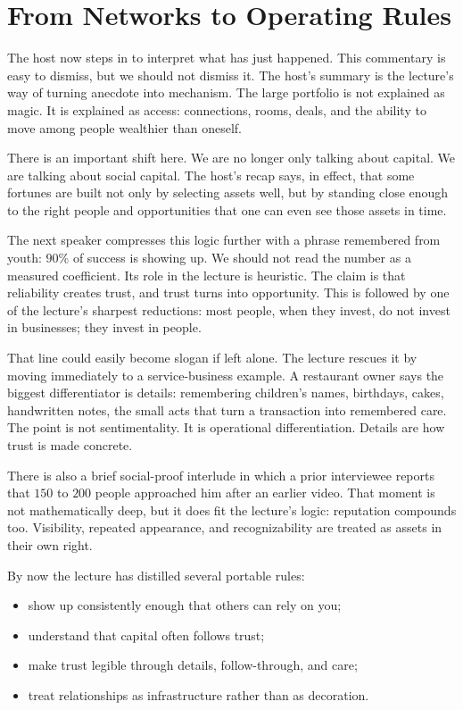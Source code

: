 \section{From Networks to Operating Rules}

The host now steps in to interpret what has just happened. This commentary is easy to dismiss, but we should not dismiss it. The host's summary is the lecture's way of turning anecdote into mechanism. The large portfolio is not explained as magic. It is explained as access: connections, rooms, deals, and the ability to move among people wealthier than oneself.

There is an important shift here. We are no longer only talking about capital. We are talking about social capital. The host's recap says, in effect, that some fortunes are built not only by selecting assets well, but by standing close enough to the right people and opportunities that one can even see those assets in time.

The next speaker compresses this logic further with a phrase remembered from youth: \(90\%\) of success is showing up. We should not read the number as a measured coefficient. Its role in the lecture is heuristic. The claim is that reliability creates trust, and trust turns into opportunity. This is followed by one of the lecture's sharpest reductions: most people, when they invest, do not invest in businesses; they invest in people.

That line could easily become slogan if left alone. The lecture rescues it by moving immediately to a service-business example. A restaurant owner says the biggest differentiator is details: remembering children's names, birthdays, cakes, handwritten notes, the small acts that turn a transaction into remembered care. The point is not sentimentality. It is operational differentiation. Details are how trust is made concrete.

There is also a brief social-proof interlude in which a prior interviewee reports that \(150\) to \(200\) people approached him after an earlier video. That moment is not mathematically deep, but it does fit the lecture's logic: reputation compounds too. Visibility, repeated appearance, and recognizability are treated as assets in their own right.

By now the lecture has distilled several portable rules:
\begin{itemize}
\item show up consistently enough that others can rely on you;
\item understand that capital often follows trust;
\item make trust legible through details, follow-through, and care;
\item treat relationships as infrastructure rather than as decoration.
\end{itemize}

